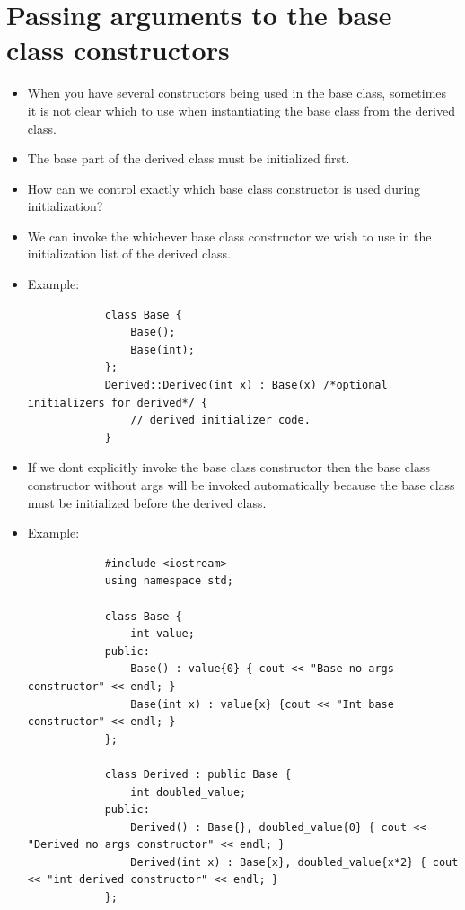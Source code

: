 \section{Passing arguments to the base class constructors}
\begin{itemize}
    \item When you have several constructors being used in the base class, sometimes it is not clear which to use when instantiating the base class from the derived class. 
    \item The base part of the derived class must be initialized first.
    \item How can we control exactly which base class constructor is used during initialization?
    \item We can invoke the whichever base class constructor we wish to use in the initialization list of the derived class. 
    \item Example:
        \begin{verbatim}
            class Base {
                Base();
                Base(int);
            };
            Derived::Derived(int x) : Base(x) /*optional initializers for derived*/ {
                // derived initializer code.
            }
        \end{verbatim}
    
    \item If we dont explicitly invoke the base class constructor then the base class constructor without args will be invoked automatically because the base class must be initialized before the derived class.
    \item Example:
        \begin{verbatim}
            #include <iostream>
            using namespace std;

            class Base {
                int value;
            public:
                Base() : value{0} { cout << "Base no args constructor" << endl; }
                Base(int x) : value{x} {cout << "Int base constructor" << endl; }
            };

            class Derived : public Base {
                int doubled_value;
            public:
                Derived() : Base{}, doubled_value{0} { cout << "Derived no args constructor" << endl; }
                Derived(int x) : Base{x}, doubled_value{x*2} { cout << "int derived constructor" << endl; }
            };


\end{verbatim}
\end{itemize}
